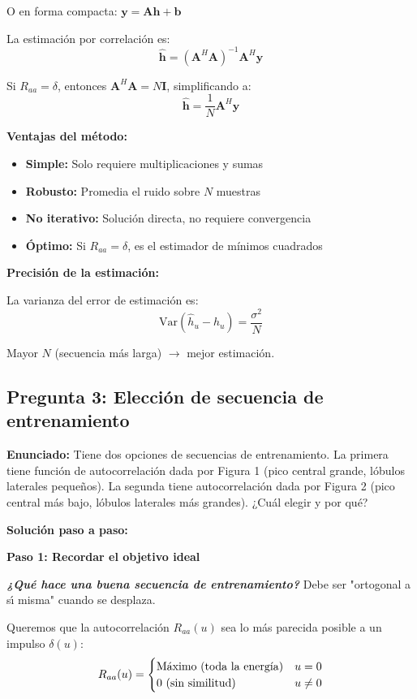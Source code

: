 \documentclass[11pt,a4paper]{article}
\begin{document}
O en forma compacta: $\mathbf{y} = \mathbf{A} \mathbf{h} + \mathbf{b}$

La estimaci\'on por correlaci\'on es:
\[
\hat{\mathbf{h}} = (\mathbf{A}^H \mathbf{A})^{-1} \mathbf{A}^H \mathbf{y}
\]

Si $R_{aa} = \delta$, entonces $\mathbf{A}^H \mathbf{A} = N \mathbf{I}$, simplificando a:
\[
\hat{\mathbf{h}} = \frac{1}{N} \mathbf{A}^H \mathbf{y}
\]

\textbf{Ventajas del m\'etodo:}

\begin{itemize}
    \item \textbf{Simple:} Solo requiere multiplicaciones y sumas
    \item \textbf{Robusto:} Promedia el ruido sobre $N$ muestras
    \item \textbf{No iterativo:} Soluci\'on directa, no requiere convergencia
    \item \textbf{\'Optimo:} Si $R_{aa} = \delta$, es el estimador de m\'inimos cuadrados
\end{itemize}

\textbf{Precisi\'on de la estimaci\'on:}

La varianza del error de estimaci\'on es:
\[
\text{Var}(\hat{h}_u - h_u) = \frac{\sigma^2}{N}
\]

Mayor $N$ (secuencia m\'as larga) $\to$ mejor estimaci\'on.



\subsection*{Pregunta 3: Elecci\'on de secuencia de entrenamiento}

\textbf{Enunciado:} Tiene dos opciones de secuencias de entrenamiento. La primera tiene funci\'on de autocorrelaci\'on dada por Figura 1 (pico central grande, l\'obulos laterales peque\~nos). La segunda tiene autocorrelaci\'on dada por Figura 2 (pico central m\'as bajo, l\'obulos laterales m\'as grandes). ¿Cu\'al elegir y por qu\'e?

\vspace{0.3cm}
\textbf{Soluci\'on paso a paso:}

\textbf{Paso 1: Recordar el objetivo ideal}

\textit{\textbf{¿Qu\'e hace una buena secuencia de entrenamiento?}} Debe ser "ortogonal a s\'{\i} misma" cuando se desplaza.

Queremos que la autocorrelaci\'on $R_{aa}(u)$ sea lo m\'as parecida posible a un impulso $\delta(u)$:
\[
R_{aa}(u) = \begin{cases}
\text{M\'aximo (toda la energ\'{\i}a)} & u = 0 \\
0 \text{ (sin similitud)} & u \neq 0
\end{cases}
\]
\end{document}
